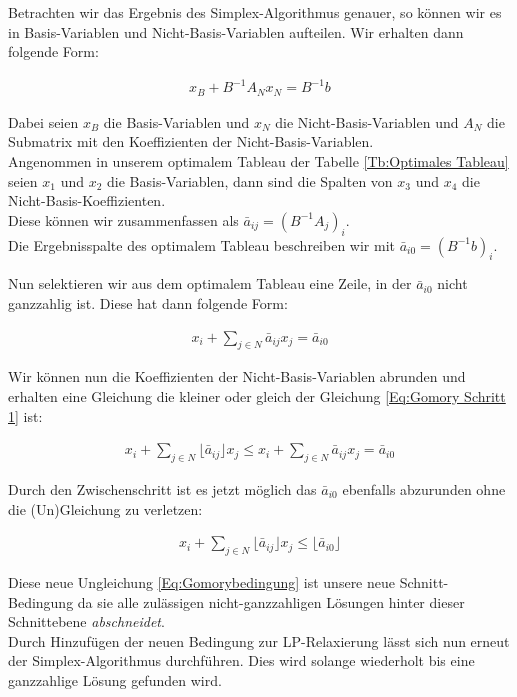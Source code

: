 \documentclass[tog]{acmsiggraph}
\begin{document}
Betrachten wir das Ergebnis des Simplex-Algorithmus genauer, so können wir es in Basis-Variablen und Nicht-Basis-Variablen aufteilen. Wir erhalten dann folgende Form:

\large
\begin{align}
\label{Eq:SimplexBasis}
x_B + B^{-1} A_N x_N = B^{-1}b
\end{align}
\normalsize

Dabei seien $x_B$ die Basis-Variablen und $x_N$ die Nicht-Basis-Variablen und $A_N$ die Submatrix mit den Koeffizienten der Nicht-Basis-Variablen.\\
Angenommen in unserem optimalem Tableau der Tabelle \ref{Tb:Optimales Tableau} seien $x_1$ und $x_2$ die Basis-Variablen, dann sind die Spalten von $x_3$ und $x_4$ die Nicht-Basis-Koeffizienten.\\
Diese können wir zusammenfassen als $\bar{a}_{ij} = (B^{-1} A_j)_i$. \\
Die Ergebnisspalte des optimalem Tableau beschreiben wir mit $\bar{a}_{i0} = (B^{-1} b)_i$.

Nun selektieren wir aus dem optimalem Tableau eine Zeile, in der $\bar{a}_{i0}$ nicht ganzzahlig ist. Diese hat dann folgende Form:

\large
\begin{align}
\label{Eq:Gomory Schritt 1}
x_i + \sum_{j \in N} \bar{a}_{ij} x_{j} = \bar{a}_{i0}
\end{align}
\normalsize

Wir können nun die Koeffizienten der Nicht-Basis-Variablen abrunden und erhalten eine Gleichung die kleiner oder gleich der Gleichung \ref{Eq:Gomory Schritt 1} ist:

\large
\begin{align}
\label{Eq:Gomory Schritt 2}
 x_i + \sum_{j \in N} \lfloor\bar{a}_{ij}\rfloor x_{j} \leq x_i + \sum_{j \in N} \bar{a}_{ij} x_{j} = \bar{a}_{i0}
\end{align}
\normalsize

Durch den Zwischenschritt ist es jetzt möglich das $\bar{a}_{i0}$ ebenfalls abzurunden ohne die (Un)Gleichung zu verletzen:

\large
\begin{align}
\label{Eq:Gomory-Bedingung}
 x_i + \sum_{j \in N} \lfloor\bar{a}_{ij}\rfloor x_{j} \leq \lfloor \bar{a}_{i0} \rfloor
\end{align}
\normalsize

Diese neue Ungleichung \ref{Eq:Gomorybedingung} ist unsere neue Schnitt-Bedingung da sie alle zulässigen nicht-ganzzahligen Lösungen hinter dieser Schnittebene \textit{abschneidet}.\\
Durch Hinzufügen der neuen Bedingung zur LP-Relaxierung lässt sich nun erneut der Simplex-Algorithmus durchführen. Dies wird solange wiederholt bis eine ganzzahlige Lösung gefunden wird.
\end{document}
